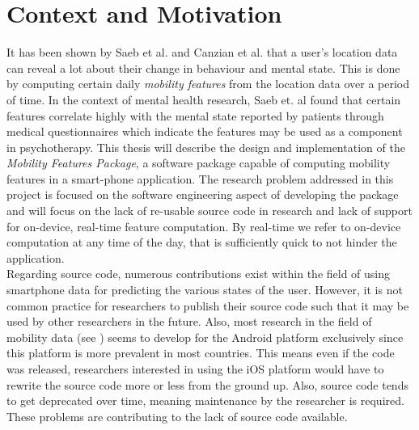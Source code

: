 \section{Context and Motivation}



It has been shown by Saeb et al. and Canzian et al. \cite{Saeb2015, Canzian2015} that a user's location data can reveal a lot about their change in behaviour and mental state. This is done by computing certain daily \textit{mobility features} from the location data over a period of time. In the context of mental health research, Saeb et. al \cite{Saeb2015} found that certain features correlate highly with the mental state reported by patients through medical questionnaires which indicate the features may be used as a component in psychotherapy. This thesis will describe the design and implementation of the \textit{Mobility Features Package}, a software package capable of computing mobility features in a smart-phone application. The research problem addressed in this project is focused on the software engineering aspect of developing the package and will focus on the lack of re-usable source code in research and lack of support for on-device, real-time feature computation. By real-time we refer to on-device computation at any time of the day, that is sufficiently quick to not hinder the application.\\

Regarding source code, numerous contributions exist within the field of using smartphone data for predicting the various states of the user. However, it is not common practice for researchers to publish their source code such that it may be used by other researchers in the future. Also, most research in the field of mobility data (see \cite{Saeb2015, saeb2016, Canzian2015, extraction-of-behavioural-features}) seems to develop for the Android platform exclusively since this platform is more prevalent in most countries. This means even if the code was released, researchers interested in using the iOS platform would have to rewrite the source code more or less from the ground up. Also, source code tends to get deprecated over time, meaning maintenance by the researcher is required. These problems are contributing to the lack of source code available.\\

